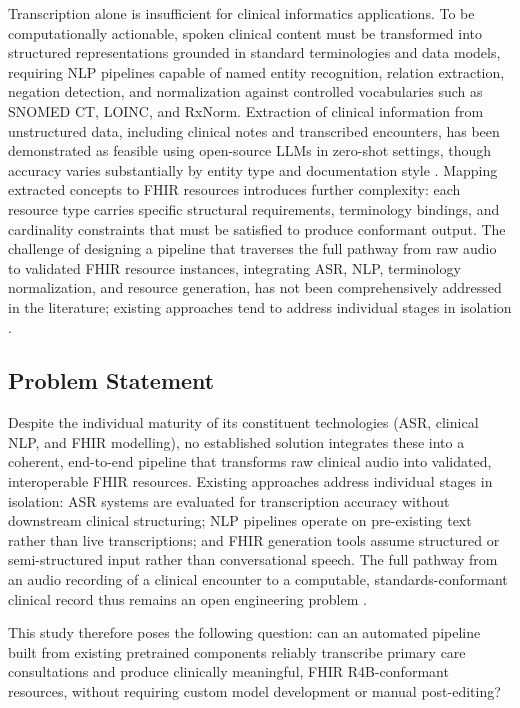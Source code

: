 Transcription alone is insufficient for clinical informatics applications. To be computationally actionable, spoken clinical content must be transformed into structured representations grounded in standard terminologies and data models, requiring NLP pipelines capable of named entity recognition, relation extraction, negation detection, and normalization against controlled vocabularies such as SNOMED CT, LOINC, and RxNorm. Extraction of clinical information from unstructured data, including clinical notes and transcribed encounters, has been demonstrated as feasible using open-source LLMs in zero-shot settings, though accuracy varies substantially by entity type and documentation style \cite{builtjes2025leveraging}. Mapping extracted concepts to FHIR resources introduces further complexity: each resource type carries specific structural requirements, terminology bindings, and cardinality constraints that must be satisfied to produce conformant output. The challenge of designing a pipeline that traverses the full pathway from raw audio to validated FHIR resource instances, integrating ASR, NLP, terminology normalization, and resource generation, has not been comprehensively addressed in the literature; existing approaches tend to address individual stages in isolation \cite{hong2020nlp2fhir, riquelme2025llm}.

\subsection{Problem Statement}

Despite the individual maturity of its constituent technologies (ASR, clinical NLP, and FHIR modelling), no established solution integrates these into a coherent, end-to-end pipeline that transforms raw clinical audio into validated, interoperable FHIR resources. Existing approaches address individual stages in isolation: ASR systems are evaluated for transcription accuracy without downstream clinical structuring; NLP pipelines operate on pre-existing text rather than live transcriptions; and FHIR generation tools assume structured or semi-structured input rather than conversational speech. The full pathway from an audio recording of a clinical encounter to a computable, standards-conformant clinical record thus remains an open engineering problem \cite{hong2020nlp2fhir, riquelme2025llm}.

This study therefore poses the following question: can an automated pipeline built from existing pretrained components reliably transcribe primary care consultations and produce clinically meaningful, FHIR R4B-conformant resources, without requiring custom model development or manual post-editing?

